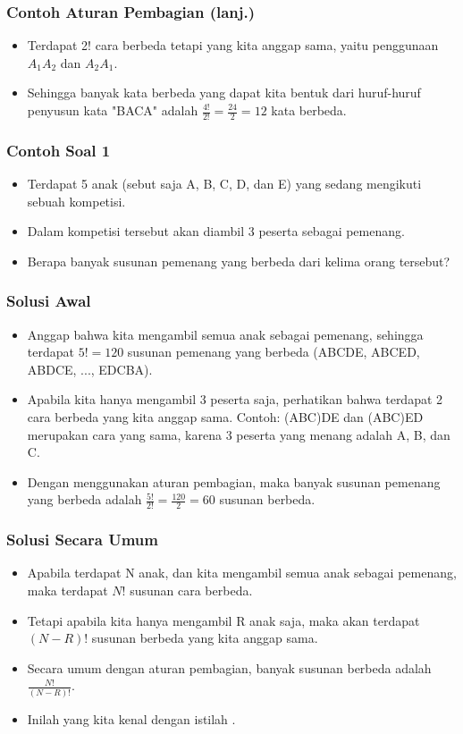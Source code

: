 \begin{frame}
\frametitle{Contoh Aturan Pembagian (lanj.)}
\begin{itemize}
  \item Terdapat 2! cara berbeda tetapi yang kita anggap sama, yaitu penggunaan $A_{1}A_{2}$ dan $A_{2}A_{1}$.
  \item Sehingga banyak kata berbeda yang dapat kita bentuk dari huruf-huruf penyusun kata "BACA" adalah $\frac{4!}{2!} = \frac{24}{2} = 12$ kata berbeda.
\end{itemize}
\end{frame}

\begin{frame}
\frametitle{Contoh Soal 1}
\begin{itemize}
  \item Terdapat 5 anak (sebut saja A, B, C, D, dan E) yang sedang mengikuti sebuah kompetisi.
  \item Dalam kompetisi tersebut akan diambil 3 peserta sebagai pemenang.
  \item Berapa banyak susunan pemenang yang berbeda dari kelima orang tersebut?
\end{itemize}
\end{frame}

\begin{frame}
\frametitle{Solusi Awal}
\begin{itemize}
  \item Anggap bahwa kita mengambil semua anak sebagai pemenang, sehingga terdapat $5! = 120$ susunan pemenang yang berbeda (ABCDE, ABCED, ABDCE, ..., EDCBA).
  \item Apabila kita hanya mengambil 3 peserta saja, perhatikan bahwa terdapat 2 cara berbeda yang kita anggap sama. Contoh: (ABC)DE dan (ABC)ED merupakan cara yang sama, karena 3 peserta yang menang adalah A, B, dan C.
  \item Dengan menggunakan aturan pembagian, maka banyak susunan pemenang yang berbeda adalah $\frac{5!}{2!} = \frac{120}{2} = 60$ susunan berbeda.
\end{itemize}
\end{frame}

\begin{frame}
\frametitle{Solusi Secara Umum}
\begin{itemize}
  \item Apabila terdapat N anak, dan kita mengambil semua anak sebagai pemenang, maka terdapat $N!$ susunan cara berbeda.
  \item Tetapi apabila kita hanya mengambil R anak saja, maka akan terdapat $(N-R)!$ susunan berbeda yang kita anggap sama.
  \item Secara umum dengan aturan pembagian, banyak susunan berbeda adalah $\frac{N!}{(N-R)!}$.
  \item Inilah yang kita kenal dengan istilah .
\end{itemize}
\end{frame}


